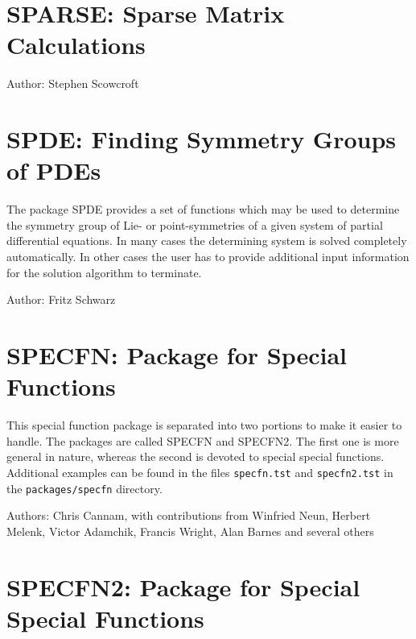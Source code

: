 

\newpage

\section{SPARSE: Sparse Matrix Calculations}

Author: Stephen Scowcroft



\newpage

\section{SPDE: Finding Symmetry Groups of PDEs}

\label{package:SPDE}

The package SPDE provides a set of functions which may be used to
determine the symmetry group of Lie- or point-symmetries of a given system
of partial differential equations. In many cases the determining system is
solved completely automatically. In other cases the user has to provide
additional input information for the solution algorithm to terminate.

Author: Fritz Schwarz



\newpage

\section{SPECFN: Package for Special Functions}

This special function package is separated into two portions to make
it easier to handle.  The packages are called SPECFN and SPECFN2.  The
first one is more general in nature, whereas the second is devoted to
special special functions.  Additional examples can
be found in the files \texttt{specfn.tst} and
\texttt{specfn2.tst} in the \texttt{packages/specfn} directory.

Authors: Chris Cannam, with contributions from Winfried Neun, Herbert
Melenk, Victor Adamchik, Francis Wright, Alan Barnes and several others



\section{SPECFN2: Package for Special Special Functions}

